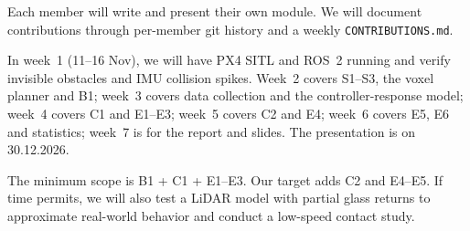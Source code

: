 \documentclass[conference,10pt]{IEEEtran}
\begin{document}
Each member will write and present their own module. We will document contributions through per-member git history and a weekly \texttt{CONTRIBUTIONS.md}.

In week~1 (11--16 Nov), we will have PX4 SITL and ROS~2 running and verify invisible obstacles and IMU collision spikes. Week~2 covers S1--S3, the voxel planner and B1; week~3 covers data collection and the controller-response model; week~4 covers C1 and E1--E3; week~5 covers C2 and E4; week~6 covers E5, E6 and statistics; week~7 is for the report and slides. The presentation is on 30.12.2026.

The minimum scope is B1 + C1 + E1--E3. Our target adds C2 and E4--E5. If time permits, we will also test a LiDAR model with partial glass returns to approximate real-world behavior and conduct a low-speed contact study.
\end{document}
